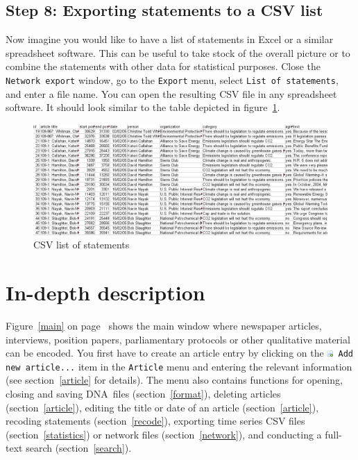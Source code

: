 \documentclass[12pt,a4paper]{scrreprt}
\newcommand{\dnashort}{\textsc{DNA}}
\newcommand{\code}[1]{\texttt{#1}}
\begin{document}
\section*{Step 8: Exporting statements to a CSV list}
Now imagine you would like to have a list of statements in Excel or a similar spreadsheet software. This can be useful to take stock of the overall picture or to combine the statements with other data for statistical purposes. Close the \code{Network export} window, go to the \code{Export} menu, select \code{List of statements}, and enter a file name. You can open the resulting CSV file in any spreadsheet software. It should look similar to the table depicted in figure~\ref{csvlist}.
\begin{figure}
 \begin{center}
  \includegraphics[scale=0.4]{csvlist.png}
 \end{center}
 \caption{CSV list of statements}
 \label{csvlist}
\end{figure}


\chapter{In-depth description}\label{indepth}
Figure~\ref{main} on page~\pageref{main} shows the main window where newspaper articles, interviews, position papers, parliamentary protocols or other qualitative material can be encoded. You first have to create an article entry by clicking on the \code{\includegraphics[height=9px]{icons-newarticle.png} Add new article...} item in the \code{Article} menu and entering the relevant information (see section~\ref{article} for details). The menu also contains functions for opening, closing and saving \dnashort\ files (section~\ref{format}), deleting articles (section~\ref{article}), editing the title or date of an article (section~\ref{article}), recoding statements (section~\ref{recode}), exporting time series CSV files (section~\ref{statistics}) or network files (section~\ref{network}), and conducting a full-text search (section~\ref{search}).
\end{document}
